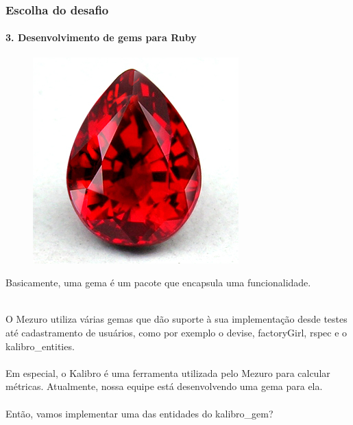 \documentclass{beamer}
\begin{document}
\begin{frame}
  \frametitle{Escolha do desafio}
  \framesubtitle{3. Desenvolvimento de gems para Ruby}

  \begin{multicols}{2}
    \begin{figure}[htb]
      \begin{center}
        \includegraphics[scale=0.1]{ruby-gem.jpg}
      \end{center}
    \end{figure}

    \columnbreak
    
    Basicamente, uma gema é um pacote que encapsula uma funcionalidade. \\~\\
  \end{multicols}

  O Mezuro utiliza várias gemas que dão suporte à sua implementação desde testes até cadastramento de usuários, como por exemplo o devise, factoryGirl, rspec e o kalibro\_entities.\\~\\
  
  Em especial, o Kalibro é uma ferramenta utilizada pelo Mezuro para calcular métricas. Atualmente, nossa equipe está desenvolvendo uma gema para ela. \\~\\
  
  Então, vamos implementar uma das entidades do kalibro\_gem?

\end{frame}
\end{document}
